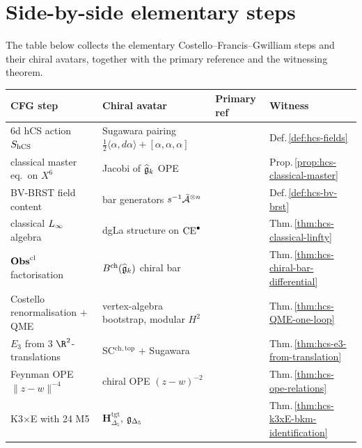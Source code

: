 \section{Side-by-side elementary steps}
\label{sec:hcs-side-by-side}

The table below collects the elementary
Costello--Francis--Gwilliam steps and their chiral avatars, together
with the primary reference and the witnessing theorem.

{\small
\begin{center}
\begin{tabular}{p{3cm}p{3cm}p{3cm}p{3cm}}
 \toprule
 CFG step & Chiral avatar & Primary ref & Witness \\
 \midrule
 6d hCS action $S_{\mathrm{hCS}}$
 & Sugawara pairing $\tfrac{1}{2}\langle\alpha,d\alpha\rangle+[\alpha,\alpha,\alpha]$
 & \cite{CostelloYangian}
 & Def.\,\ref{def:hcs-fields} \\
 classical master eq.\ on $X^6$
 & Jacobi of $\widehat{\mathfrak{g}}_k$ OPE
 & \cite{CostelloGwilliam2017}
 & Prop.\,\ref{prop:hcs-classical-master} \\
 BV-BRST field content
 & bar generators $s^{-1}\bar{\mathcal{A}}^{\otimes n}$
 & \cite{CG17}
 & Def.\,\ref{def:hcs-bv-brst} \\
 classical $L_\infty$ algebra
 & dgLa structure on $\mathrm{CE}^\bullet$
 & \cite{CostelloGwilliam2017}
 & Thm.\,\ref{thm:hcs-classical-linfty} \\
 $\mathbf{Obs}^{\mathrm{cl}}$ factorisation
 & $B^{\mathrm{ch}}(\widehat{\mathfrak{g}}_k)$ chiral bar
 & \cite{BD04}
 & Thm.\,\ref{thm:hcs-chiral-bar-differential} \\
 Costello renormalisation + QME
 & vertex-algebra bootstrap, modular $H^2$
 & \cite{CostelloRenormalization}
 & Thm.\,\ref{thm:hcs-QME-one-loop} \\
 $E_3$ from 3 $\R^2$-translations
 & SC$^{\mathrm{ch,top}}$ + Sugawara
 & \cite{LurieHA}
 & Thm.\,\ref{thm:hcs-e3-from-translation} \\
 Feynman OPE $\|z-w\|^{-4}$
 & chiral OPE $(z-w)^{-2}$
 & \cite{CostelloRenormalization}
 & Thm.\,\ref{thm:hcs-ope-relations} \\
 K3$\times$E with 24 M5
 & $\mathbf{H}_{\Delta_5}^{\mathrm{tgt}}$, $\mathfrak{g}_{\Delta_5}$
 & \cite{Gaiotto2009,Borcherds98}
 & Thm.\,\ref{thm:hcs-k3xE-bkm-identification} \\
 \bottomrule
\end{tabular}
\end{center}
}

